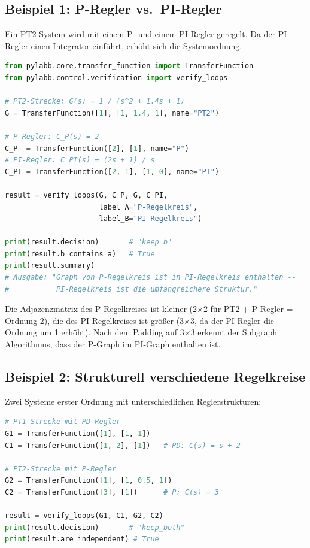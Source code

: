 \documentclass[a4paper,12pt]{article}
\theoremstyle{definition}
\begin{document}
\subsection{Beispiel 1: P-Regler vs.\ PI-Regler}

Ein PT2-System wird mit einem P- und einem PI-Regler geregelt. Da der
PI-Regler einen Integrator einführt, erhöht sich die Systemordnung.

\begin{lstlisting}[language=Python, caption=Verifikation P- vs.\ PI-Regler]
from pylabb.core.transfer_function import TransferFunction
from pylabb.control.verification import verify_loops

# PT2-Strecke: G(s) = 1 / (s^2 + 1.4s + 1)
G = TransferFunction([1], [1, 1.4, 1], name="PT2")

# P-Regler: C_P(s) = 2
C_P  = TransferFunction([2], [1], name="P")
# PI-Regler: C_PI(s) = (2s + 1) / s
C_PI = TransferFunction([2, 1], [1, 0], name="PI")

result = verify_loops(G, C_P, G, C_PI,
                      label_A="P-Regelkreis",
                      label_B="PI-Regelkreis")

print(result.decision)       # "keep_b"
print(result.b_contains_a)   # True
print(result.summary)
# Ausgabe: "Graph von P-Regelkreis ist in PI-Regelkreis enthalten --
#           PI-Regelkreis ist die umfangreichere Struktur."
\end{lstlisting}

Die Adjazenzmatrix des P-Regelkreises ist kleiner (2×2 für PT2 + P-Regler =
Ordnung 2), die des PI-Regelkreises ist größer (3×3, da der PI-Regler die
Ordnung um 1 erhöht). Nach dem Padding auf 3×3 erkennt der Subgraph Algorithmus,
dass der P-Graph im PI-Graph enthalten ist.

\subsection{Beispiel 2: Strukturell verschiedene Regelkreise}

Zwei Systeme erster Ordnung mit unterschiedlichen Reglerstrukturen:

\begin{lstlisting}[language=Python, caption=Verifikation strukturell verschiedener Regelkreise]
# PT1-Strecke mit PD-Regler
G1 = TransferFunction([1], [1, 1])
C1 = TransferFunction([1, 2], [1])   # PD: C(s) = s + 2

# PT2-Strecke mit P-Regler
G2 = TransferFunction([1], [1, 0.5, 1])
C2 = TransferFunction([3], [1])      # P: C(s) = 3

result = verify_loops(G1, C1, G2, C2)
print(result.decision)       # "keep_both"
print(result.are_independent) # True
\end{lstlisting}
\end{document}
